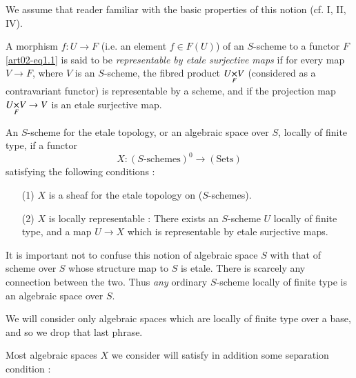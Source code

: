 We assume that reader familiar with the basic properties of this notion (cf. \cite{art02-key6} I, II, \cite{art02-key7} IV).

A morphism $f:U\to F$ (i.e. an element $f\in F(U)$) of an $S$-scheme to a functor $F$ \eqref{art02-eq1.1} is said to be {\em representable by etale surjective maps} if for every map $V\to F$, where $V$ is an $S$-scheme, the fibred product $\fprod{U}{V}{F}$ (considered as a contravariant functor) is representable by a scheme, and if the projection map $\fprod{U}{V}{F}\to V$ is an etale surjective map.

\setcounter{definition}{2}
\begin{definition}\label{art02-defi1.3}
An $S$-scheme for the etale topology, or an algebraic space over $S$, locally of finite type, if a functor
$$
X:(S\text{-schemes})^{0}\to (\text{Sets})
$$
satisfying the following conditions :
\begin{itemize}
\item[\rm(1)] $X$ is a sheaf for the etale topology on ($S$-schemes).

\item[\rm(2)] $X$ is locally representable : There exists an $S$-scheme $U$ locally of finite type, and a map $U\to X$ which is representable by etale surjective maps.
\end{itemize}
\end{definition}

It is important not to confuse this notion of algebraic space $S$ with that of scheme over $S$ whose structure map to $S$ is etale. There is scarcely any connection between the two. Thus {\em any} ordinary $S$-scheme locally of finite type is an algebraic space over $S$.

We will consider only algebraic spaces which are locally of finite type over a base, and so we drop that last phrase.

Most algebraic spaces $X$ we consider will satisfy in addition some separation condition :

